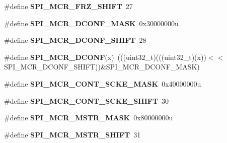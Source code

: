 \begin{DoxyCompactItemize}
\item 
\#define {\bfseries S\+P\+I\+\_\+\+M\+C\+R\+\_\+\+F\+R\+Z\+\_\+\+S\+H\+I\+FT}~27\hypertarget{group__SPI__Register__Masks_ga7500a54a21171d20a3bbf0355350c9bd}{}\label{group__SPI__Register__Masks_ga7500a54a21171d20a3bbf0355350c9bd}

\item 
\#define {\bfseries S\+P\+I\+\_\+\+M\+C\+R\+\_\+\+D\+C\+O\+N\+F\+\_\+\+M\+A\+SK}~0x30000000u\hypertarget{group__SPI__Register__Masks_gab6f80a07ce3be21ee0de56c3de90f380}{}\label{group__SPI__Register__Masks_gab6f80a07ce3be21ee0de56c3de90f380}

\item 
\#define {\bfseries S\+P\+I\+\_\+\+M\+C\+R\+\_\+\+D\+C\+O\+N\+F\+\_\+\+S\+H\+I\+FT}~28\hypertarget{group__SPI__Register__Masks_ga5f84d391d6b5838c50b44217617d66a8}{}\label{group__SPI__Register__Masks_ga5f84d391d6b5838c50b44217617d66a8}

\item 
\#define {\bfseries S\+P\+I\+\_\+\+M\+C\+R\+\_\+\+D\+C\+O\+NF}(x)~(((uint32\+\_\+t)(((uint32\+\_\+t)(x))$<$$<$S\+P\+I\+\_\+\+M\+C\+R\+\_\+\+D\+C\+O\+N\+F\+\_\+\+S\+H\+I\+FT))\&S\+P\+I\+\_\+\+M\+C\+R\+\_\+\+D\+C\+O\+N\+F\+\_\+\+M\+A\+SK)\hypertarget{group__SPI__Register__Masks_ga4157226a8f489e3d1d8321beed0afcb6}{}\label{group__SPI__Register__Masks_ga4157226a8f489e3d1d8321beed0afcb6}

\item 
\#define {\bfseries S\+P\+I\+\_\+\+M\+C\+R\+\_\+\+C\+O\+N\+T\+\_\+\+S\+C\+K\+E\+\_\+\+M\+A\+SK}~0x40000000u\hypertarget{group__SPI__Register__Masks_gad40a2cace787fe5eaaf74379ffb7cfc2}{}\label{group__SPI__Register__Masks_gad40a2cace787fe5eaaf74379ffb7cfc2}

\item 
\#define {\bfseries S\+P\+I\+\_\+\+M\+C\+R\+\_\+\+C\+O\+N\+T\+\_\+\+S\+C\+K\+E\+\_\+\+S\+H\+I\+FT}~30\hypertarget{group__SPI__Register__Masks_ga57c862186e43a26823716267bfadd92f}{}\label{group__SPI__Register__Masks_ga57c862186e43a26823716267bfadd92f}

\item 
\#define {\bfseries S\+P\+I\+\_\+\+M\+C\+R\+\_\+\+M\+S\+T\+R\+\_\+\+M\+A\+SK}~0x80000000u\hypertarget{group__SPI__Register__Masks_gaa201344af736c83618497329b6529f04}{}\label{group__SPI__Register__Masks_gaa201344af736c83618497329b6529f04}

\item 
\#define {\bfseries S\+P\+I\+\_\+\+M\+C\+R\+\_\+\+M\+S\+T\+R\+\_\+\+S\+H\+I\+FT}~31\hypertarget{group__SPI__Register__Masks_ga7118ec0360c840ddef7e666831cb13fb}{}\label{group__SPI__Register__Masks_ga7118ec0360c840ddef7e666831cb13fb}


\end{DoxyCompactItemize}
